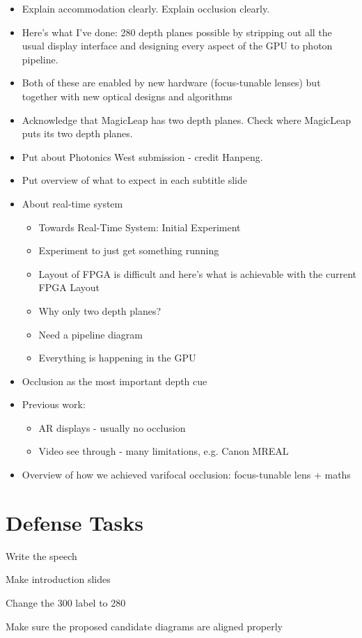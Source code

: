 \begin{itemize}
\item Explain accommodation clearly. Explain occlusion clearly.
\item Here's what I've done: 280 depth planes possible by stripping out all the usual display interface and designing every aspect of the GPU to photon pipeline.
\item Both of these are enabled by new hardware (focus-tunable lenses) but together with new optical designs and algorithms
\item Acknowledge that MagicLeap has two depth planes. Check where MagicLeap puts its two depth planes. 
\item Put about Photonics West submission - credit Hanpeng.
\item Put overview of what to expect in each subtitle slide
\item About real-time system
    \begin{itemize}
    \item Towards Real-Time System: Initial Experiment
    \item Experiment to just get something running
    \item Layout of FPGA is difficult and here's what is achievable with the current FPGA Layout
    \item Why only two depth planes?
    \item Need a pipeline diagram
    \item Everything is happening in the GPU
    \end{itemize}
\item Occlusion as the most important depth cue
\item Previous work:
    \begin{itemize}
    \item AR displays - usually no occlusion
    \item Video see through - many limitations, e.g. Canon MREAL
    \end{itemize}
\item Overview of how we achieved varifocal occlusion: focus-tunable lens + maths
\end{itemize}

\section{Defense Tasks}
\begin{todolist}
\item Write the speech
\item Make introduction slides
\item Change the 300 label to 280
\item Make sure the proposed candidate diagrams are aligned properly
\end{todolist}


